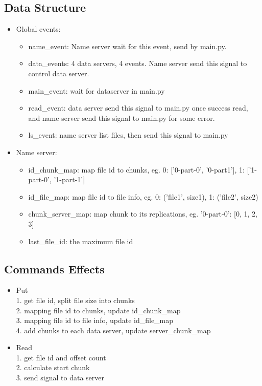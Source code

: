 \documentclass{article}
\begin{document}
\subsection{Data Structure}
\begin{itemize}
    \item Global events:
        \begin{itemize}
            \item name\_event: Name server wait for this event, send by main.py. 
            \item data\_events: 4 data servers, 4 events. Name server send this signal to control data server.
            \item main\_event: wait for dataserver in main.py
            \item read\_event: data server send this signal to main.py once success read, and name server send this signal to main.py for some error.
            \item ls\_event: name server list files, then send this signal to main.py
        \end{itemize}
    \item Name server:
        \begin{itemize}
            \item id\_chunk\_map: map file id to chunks, eg. {0: ['0-part-0', '0-part1'], 1: ['1-part-0', '1-part-1']}
            \item id\_file\_map: map file id to file info, eg. {0: ('file1', size1), 1: ('file2', size2)}
            \item chunk\_server\_map: map chunk to its replications, eg. {'0-part-0': [0, 1, 2, 3]}
            \item last\_file\_id: the maximum file id
        \end{itemize}
\end{itemize}

\subsection{Commands Effects}
\begin{itemize}
    \item Put\\
        1. get file id, split file size into chunks\\
        2. mapping file id to chunks, update id\_chunk\_map\\
        3. mapping file id to file info, update id\_file\_map\\
        4. add chunks to each data server, update server\_chunk\_map
    \item Read\\
        1. get file id and offset count \\
        2. calculate start chunk \\
        3. send signal to data server 
\end{itemize}
\end{document}
